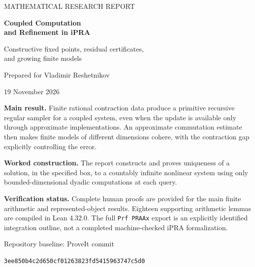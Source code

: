 \documentclass[11pt,a4paper]{article}
\theoremstyle{definition}
\theoremstyle{remark}
\begin{document}
\begin{titlepage}
\vspace*{14mm}
{\large\color{ink}MATHEMATICAL RESEARCH REPORT\par}
\vspace{11mm}
{\huge\bfseries\color{ink}Coupled Computation\\[5pt]and Refinement in iPRA\par}
\vspace{9mm}
{\Large Constructive fixed points, residual certificates,\\
and growing finite models\par}
\vspace{13mm}
{\large Prepared for Vladimir Reshetnikov\par}
\vspace{3mm}
19 November 2026\par
\vfill
\begin{minipage}{0.94\textwidth}
\textbf{Main result.} Finite rational contraction data produce a primitive
recursive regular sampler for a coupled system, even when the update is
available only through approximate implementations. An approximate
commutation estimate then makes finite models of different dimensions
cohere, with the contraction gap explicitly controlling the error.
\medskip

\textbf{Worked construction.} The report constructs and proves uniqueness
of a solution, in the specified box, to a countably infinite nonlinear
system using only bounded-dimensional dyadic computations at each query.
\medskip

\textbf{Verification status.} Complete human proofs are provided for the
main finite arithmetic and represented-object results. Eighteen supporting
arithmetic lemmas are compiled in Lean 4.32.0. The full
\texttt{Prf PRAAx} export is an explicitly identified integration outline,
not a completed machine-checked iPRA formalization.
\end{minipage}
\vspace{9mm}
{\small Repository baseline: ProveIt commit\par
\texttt{3ee850b4c2d650cf01263823fd5415963747c5d0}\par}
\end{titlepage}
\end{document}
